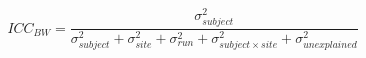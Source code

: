 \begin{equation}
ICC_{BW} = \frac{\sigma_{subject}^2}{\sigma_{subject}^2+\sigma_{site}^2+\sigma_{run}^2+\sigma_{subject \times site}^2 + \sigma_{unexplained}^2}
\end{equation}